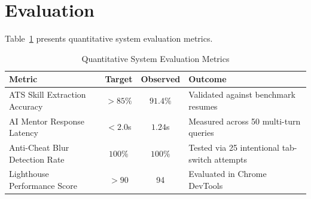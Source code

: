\section{Evaluation}
Table~\ref{tab:eval_metrics} presents quantitative system evaluation metrics.

\begin{table}[htbp]
\centering
\footnotesize
\caption{Quantitative System Evaluation Metrics}
\label{tab:eval_metrics}
\begin{tabularx}{\textwidth}{l c c X}
\toprule
\textbf{Metric} & \textbf{Target} & \textbf{Observed} & \textbf{Outcome} \\
\midrule
ATS Skill Extraction Accuracy & $>85\%$ & $91.4\%$ & Validated against benchmark resumes \\
AI Mentor Response Latency & $<2.0$s & $1.24$s & Measured across 50 multi-turn queries \\
Anti-Cheat Blur Detection Rate & $100\%$ & $100\%$ & Tested via 25 intentional tab-switch attempts \\
Lighthouse Performance Score & $>90$ & 94 & Evaluated in Chrome DevTools \\
\bottomrule
\end{tabularx}
\end{table}
